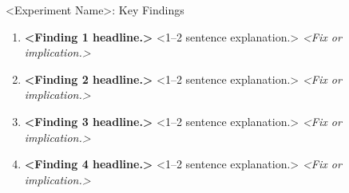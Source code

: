 
\begin{frame}{<Experiment Name>: Key Findings}
\begin{enumerate}
  \item[\faIcon{chart-bar}\;] \textbf{<Finding 1 headline.>}
    <1–2 sentence explanation.>
    \textit{<Fix or implication.>}

  \vspace{0.5em}
  \item[\faIcon{lightbulb}\;] \textbf{<Finding 2 headline.>}
    <1–2 sentence explanation.>
    \textit{<Fix or implication.>}

  \vspace{0.5em}
  \item[\faIcon{bug}\;] \textbf{<Finding 3 headline.>}
    <1–2 sentence explanation.>
    \textit{<Fix or implication.>}

  \vspace{0.5em}
  \item[\faIcon{check-circle}\;] \textbf{<Finding 4 headline.>}
    <1–2 sentence explanation.>
    \textit{<Fix or implication.>}
\end{enumerate}
\end{frame}
